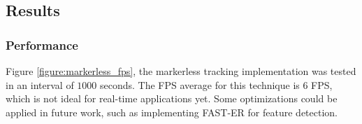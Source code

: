 \clearpage


\subsection{Results} %
\label{sub:evaluation:markerless_tracking_algorithm:results}

\subsubsection{Performance} %
\label{subsub:evaluation:markerless_tracking_algorithm:results:performance}

Figure \ref{figure:markerless_fps}, the markerless tracking implementation was tested in an interval of $1000$ seconds. The FPS average for this technique is 6 FPS, which is not ideal for real-time applications yet. Some optimizations could be applied in future work, such as implementing FAST-ER \cite{RostenFaster2010} for feature detection.

